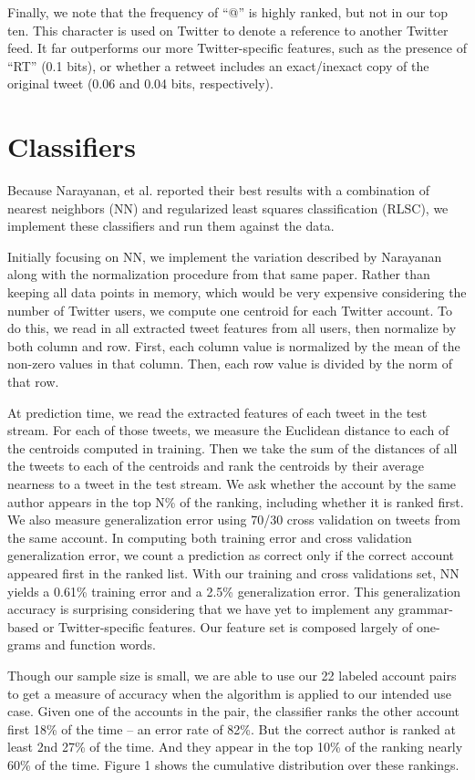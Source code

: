 \documentclass[10pt, conference, compsocconf]{IEEEtran}
\begin{document}
Finally, we note that the frequency of ``@'' is highly ranked, but not
in our top ten. This character is used on Twitter to denote a
reference to another Twitter feed. It far outperforms our more
Twitter-specific features, such as the presence of ``RT'' (0.1 bits),
or whether a retweet includes an exact/inexact copy of the original
tweet (0.06 and 0.04 bits, respectively).

\section{Classifiers}

Because Narayanan, et al. reported their best results with a
combination of nearest neighbors (NN) and regularized least squares
classification (RLSC), we implement these classifiers
and run them against the data. 

Initially focusing on NN, we implement the variation described by Narayanan
along with the normalization procedure from that same paper. Rather
than keeping all data points in memory, which would be very expensive
considering the number of Twitter users, we compute one centroid for
each Twitter account. To do this, we read in all extracted tweet
features from all users, then normalize by both column and row. First,
each column value is normalized by the mean of the non-zero values in
that column. Then, each row value is divided by the norm of that row.

At prediction time, we read the extracted features of each tweet in
the test stream. For each of those tweets, we measure the Euclidean
distance to each of the centroids computed in training. Then we take
the sum of the distances of all the tweets to each of the centroids
and rank the centroids by their average nearness to a tweet in the
test stream. We ask whether the account by the same author appears in
the top N\% of the ranking, including whether it is ranked
first. We also measure generalization error using
70/30 cross validation on tweets from the same account. In computing
both training error and cross validation generalization error, we
count a prediction as correct only if the correct account appeared
first in the ranked list. With our training and cross validations set, NN yields a 0.61\% training error and a 2.5\% generalization error. This
generalization accuracy is surprising considering that we have yet to
implement any grammar-based or Twitter-specific features. Our feature
set is composed largely of one-grams and function words.

Though our sample size is small, we are able to use our 22 labeled
account pairs to get a measure of accuracy when the algorithm is
applied to our intended use case. Given one of the accounts in the
pair, the classifier ranks the other account first 18\% of the time --
an error rate of 82\%. But the correct author is ranked at least 2nd
27\% of the time. And they appear in the top 10\% of the ranking
nearly 60\% of the time. Figure 1 shows the cumulative distribution
over these rankings.
\end{document}
